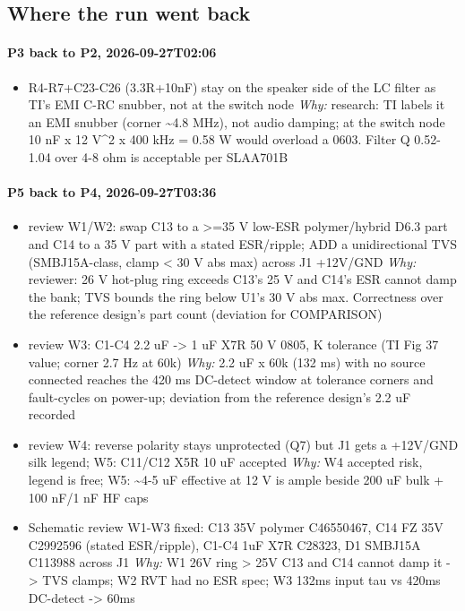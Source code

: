 \documentclass[11pt]{article}
\begin{document}
\subsection*{Where the run went back}
\paragraph*{P3 back to P2, 2026-09-27T02:06}
\begin{itemize}
\item R4-R7+C23-C26 (3.3R+10nF) stay on the speaker side of the LC filter as TI's EMI C-RC snubber, not at the switch node \emph{Why:} research: TI labels it an EMI snubber (corner \textasciitilde{}4.8 MHz), not audio damping; at the switch node 10 nF x 12 V\textasciicircum{}2 x 400 kHz = 0.58 W would overload a 0603. Filter Q 0.52-1.04 over 4-8 ohm is acceptable per SLAA701B
\end{itemize}
\paragraph*{P5 back to P4, 2026-09-27T03:36}
\begin{itemize}
\item review W1/W2: swap C13 to a \textgreater{}=35 V low-ESR polymer/hybrid D6.3 part and C14 to a 35 V part with a stated ESR/ripple; ADD a unidirectional TVS (SMBJ15A-class, clamp \textless{} 30 V abs max) across J1 +12V/GND \emph{Why:} reviewer: 26 V hot-plug ring exceeds C13's 25 V and C14's ESR cannot damp the bank; TVS bounds the ring below U1's 30 V abs max. Correctness over the reference design's part count (deviation for COMPARISON)
\item review W3: C1-C4 2.2 uF -\textgreater{} 1 uF X7R 50 V 0805, K tolerance (TI Fig 37 value; corner 2.7 Hz at 60k) \emph{Why:} 2.2 uF x 60k (132 ms) with no source connected reaches the 420 ms DC-detect window at tolerance corners and fault-cycles on power-up; deviation from the reference design's 2.2 uF recorded
\item review W4: reverse polarity stays unprotected (Q7) but J1 gets a +12V/GND silk legend; W5: C11/C12 X5R 10 uF accepted \emph{Why:} W4 accepted risk, legend is free; W5: \textasciitilde{}4-5 uF effective at 12 V is ample beside 200 uF bulk + 100 nF/1 nF HF caps
\item Schematic review W1-W3 fixed: C13 35V polymer C46550467, C14 FZ 35V C2992596 (stated ESR/ripple), C1-C4 1uF X7R C28323, D1 SMBJ15A C113988 across J1 \emph{Why:} W1 26V ring \textgreater{} 25V C13 and C14 cannot damp it -\textgreater{} TVS clamps; W2 RVT had no ESR spec; W3 132ms input tau vs 420ms DC-detect -\textgreater{} 60ms
\end{itemize}
\end{document}
